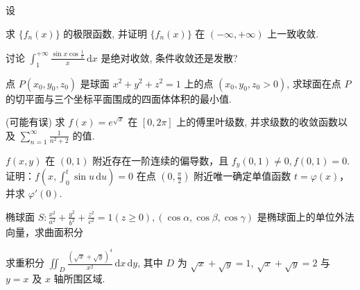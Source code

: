 \nopagebreak[4]
\par{}
\par{}
设\par
\nopagebreak[4]
求 $\{f_n(x)\}$ 的极限函数, 并证明 $\{f_n(x)\}$ 在 $(- \infty, +\infty)$ 上一致收敛.\par
\par{}
讨论 $\int_{1}^{+\infty} \frac{\sin x \cos \frac{1}{x}}{x} \, \mathrm{d}x$ 是绝对收敛, 条件收敛还是发散?\par
\par{}
点 $P(x_0, y_0, z_0)$ 是球面 $x^2 + y^2 + z^2 = 1$ 上的点 $(x_0, y_0, z_0 > 0)$, 求球面在点 $P$ 的切平面与三个坐标平面围成的四面体体积的最小值.\par
\par{}
(可能有误) 求 $f(x) = e^{\sqrt{x}}$ 在 $[0, 2\pi]$ 上的傅里叶级数, 并求级数的收敛函数以及 $\sum_{n=1}^{\infty} \frac{1}{n^2 + 2}$ 的值.\par
\par{}
$f(x,y)$ 在 $(0,1)$ 附近存在一阶连续的偏导数，且 $f_{y}(0,1) \neq 0, f(0,1) = 0$. 证明：$f\left(x, \int_{0}^{t} \sin u \, \mathrm{d}u\right) = 0$ 在点 $\left(0, \frac{\pi}{2}\right)$ 附近唯一确定单值函数 $t = \varphi(x)$，并求 $\varphi'(0)$.\par
\par{}
\par{}
椭球面 $S: \frac{x^2}{a^2} + \frac{y^2}{b^2} + \frac{z^2}{c^2} = 1 (z \geq 0), (\cos \alpha, \cos \beta, \cos \gamma)$ 是椭球面上的单位外法向量，求曲面积分\par
\nopagebreak[4]
\par{}
求重积分 $\iint_{D} \frac{(\sqrt{x} + \sqrt{y})^4}{x^2} \, \mathrm{d}x \, \mathrm{d}y$, 其中 $D$ 为 $\sqrt{x} + \sqrt{y} = 1$, $\sqrt{x} + \sqrt{y} = 2$ 与 $y = x$ 及 $x$ 轴所围区域.\par
